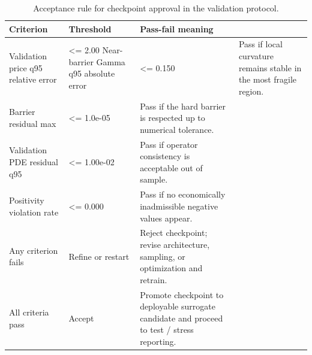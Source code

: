 \begin{table}
\caption{Acceptance rule for checkpoint approval in the validation protocol.}
\label{tab:acceptance_rule}
\begin{tabular}{lll}
\toprule
Criterion & Threshold & Pass-fail meaning \\
\midrule
Validation price q95 relative error & <= 2.00%
Near-barrier Gamma q95 absolute error & <= 0.150 & Pass if local curvature remains stable in the most fragile region. \\
Barrier residual max & <= 1.0e-05 & Pass if the hard barrier is respected up to numerical tolerance. \\
Validation PDE residual q95 & <= 1.00e-02 & Pass if operator consistency is acceptable out of sample. \\
Positivity violation rate & <= 0.000 & Pass if no economically inadmissible negative values appear. \\
Any criterion fails & Refine or restart & Reject checkpoint; revise architecture, sampling, or optimization and retrain. \\
All criteria pass & Accept & Promote checkpoint to deployable surrogate candidate and proceed to test / stress reporting. \\
\bottomrule
\end{tabular}
\end{table}
